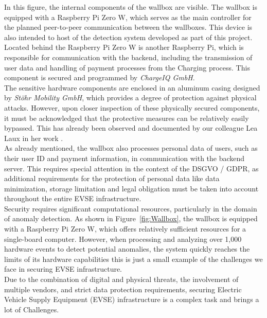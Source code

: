 In this figure, the internal components of the wallbox are visible. The wallbox is equipped with a Raspberry Pi Zero W, which serves as the main controller for the planned peer-to-peer communication between the wallboxes. This device is also intended to host of the detection system developed as part of this project.\\
Located behind the Raspberry Pi Zero W is another Raspberry Pi, which is responsible for communication with the backend, including the transmission of user data and handling of payment processes from the Charging process. This component is secured and programmed by \textit{ChargeIQ GmbH}\cite{ChargeIQ}.\\
The sensitive hardware components are enclosed in an aluminum casing designed by \textit{Stöhr Mobility GmbH}\cite{StoehrMobility}, which provides a degree of protection against physical attacks. However, upon closer inspection of these physically secured components, it must be acknowledged that the protective measures can be relatively easily bypassed. This has already been observed and documented by our colleague Lea Laux in her work \cite{Laux2024}.\\
As already mentioned, the wallbox also processes personal data of users, such as their user ID and payment information, in communication with the backend server. This requires special attention in the context of the DSGVO / GDPR, as additional requirements for the protection of personal data like data minimization, storage limitation \cite{DSGVOart5} and legal obligation \cite{DSGVOart6} must be taken into account throughout the entire EVSE infrastructure.\\
Security requires significant computational resources, particularly in the domain of anomaly detection. As shown in Figure~\ref{fig:Wallbox}, the wallbox is equipped with a Raspberry Pi Zero W, which offers relatively sufficient resources for a single-board computer. However, when processing and analyzing over 1,000 hardware events to detect potential anomalies, the system quickly reaches the limits of its hardware capabilities this is just a small example of the challenges we face in securing EVSE infrastructure.\\
Due to the combination of digital and physical threats, the involvement of multiple vendors, and strict data protection requirements, securing Electric Vehicle Supply Equipment (EVSE) infrastructure is a complex task and brings a lot of Challenges.